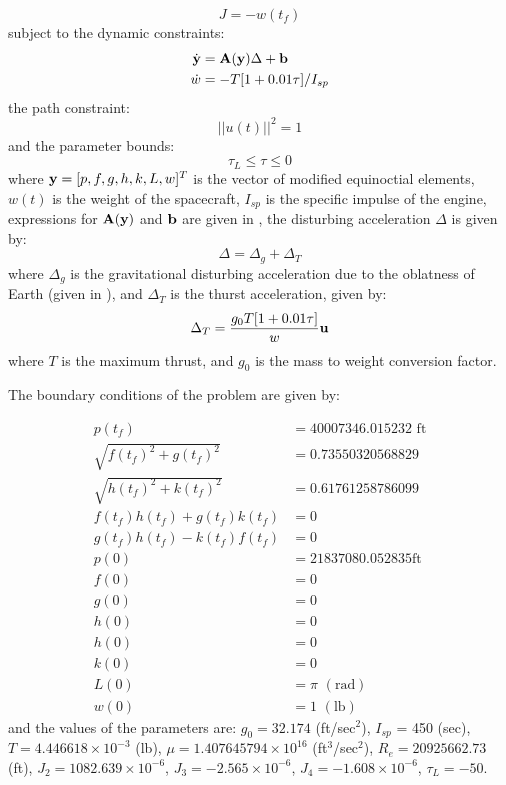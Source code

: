 \documentclass[a4paper,11pt]{report}    %
\newcommand{\mt}[1]{\ensuremath \mathbf{#1}}
\begin{document}
\begin{equation}
   J = -w(t_f)
\end{equation}
subject to the dynamic constraints:
\begin{equation}
\begin{aligned}
 \dot {\mt{y}} &= \mt{A}(\mt{y}) \Delta + \mt{b}\\
 \dot w &= -T[1+0.01 \tau]/ I_{sp}
\end{aligned}
\end{equation}
the path constraint:
\begin{equation}
  || u(t) ||^2 = 1
\end{equation}
and the parameter bounds:
\begin{equation}
 \tau_L \le \tau \le 0
\end{equation}
where $\mt{y} = [p, f, g, h, k, L, w]^T$ is the vector of modified equinoctial elements,  $w(t)$ is the 
weight of the spacecraft, $I_{sp}$ is the specific impulse of the engine, expressions for $\mt{A}(\mt{y})$ and $\mt{b}$ are given in \cite{Betts:01}, 
the disturbing acceleration $\Delta$ is given by:
\begin{equation}
 \Delta = \Delta_g + \Delta_T
\end{equation}
where $\Delta_g$ is the gravitational disturbing acceleration due to the oblatness of Earth (given in \cite{Betts:01}),
and $\Delta_T$ is the thurst acceleration, given by:
\[
  \Delta_T = \frac{g_0 T[1+0.01\tau]}{w} \mt{u}
\]
where $T$ is the maximum thrust, and $g_0$ is the mass to weight conversion factor.

The boundary conditions of the problem are given by:

\begin{equation}
 \begin{aligned}
    p(t_f) &= 40007346.015232 \,\,\mathrm{ft}\\
  \sqrt{f(t_f)^2+g(t_f)^2} &= 0.73550320568829 \\
 \sqrt{h(t_f)^2 + k(t_f)^2} &= 0.61761258786099 \\
 f(t_f) h(t_f) + g(t_f) k(t_f) &= 0 \\
 g(t_f) h(t_f) - k(t_f) f(t_f) &= 0 \\
 p(0) &= 21837080.052835 \mathrm{ft} \\
 f(0) &= 0 \\
 g(0) &= 0 \\
 h(0) &= 0 \\
 h(0) &= 0 \\ 
 k(0) &= 0 \\
 L(0) &= \pi \,\,(\mathrm{rad}) \\
 w(0) &= 1 \,\,(\mathrm{lb}) 
 \end{aligned}
\end{equation}
and the values of the parameters are: $g_0 = 32.174$ (ft/sec$^2$), $I_{sp}$ = 450 (sec), 
$T = 4.446618 \times 10^{-3}$  (lb),  $\mu = 1.407645794 \times 10^{16}$ (ft$^{3}$/sec$^{2}$),
$R_e = 20925662.73$ (ft), $J_2 =1082.639 \times 10^{-6} $,  $J_3 =-2.565 \times 10^{-6} $,
 $J_4 =-1.608 \times 10^{-6} $, $\tau_L = -50$.
\end{document}
